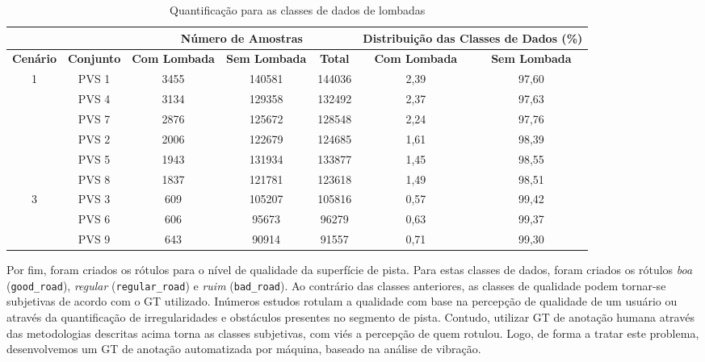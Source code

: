 \begin{table}[H]
\scriptsize
\centering
\caption{Quantificação para as classes de dados de lombadas} 
\label{table:lombada_metricas}
\begin{tabular}{ccccccc}
\cmidrule(l){3-7}
\multicolumn{1}{l}{} & 
\multicolumn{1}{l}{} & 
\multicolumn{3}{c}{\textbf{Número de Amostras}} & 
\multicolumn{2}{c}{\textbf{Distribuição das Classes de Dados (\%)}} \\ \midrule
\textbf{Cenário} & 
\textbf{Conjunto} & 
\textbf{Com Lombada} & 
\textbf{Sem Lombada} & 
\textbf{Total} & 
\textbf{Com Lombada} & 
\textbf{Sem Lombada} \\ \midrule

\multirow{4}{*}{1} & PVS 1 & 3455 & 140581 & 144036 & 2,39 & 97,60 \\ \cmidrule(l){2-7} 
 & PVS 4 & 3134 & 129358 & 132492 & 2,37 & 97,63 \\ \cmidrule(l){2-7} 
 & PVS 7 & 2876 & 125672 & 128548 & 2,24 & 97,76 \\ \midrule
 
\multirow{4}{*}{2} & PVS 2 & 2006 & 122679 & 124685 & 1,61 & 98,39 \\ \cmidrule(l){2-7} 
 & PVS 5 & 1943 & 131934 & 133877 & 1,45 & 98,55 \\ \cmidrule(l){2-7} 
 & PVS 8 & 1837 & 121781 & 123618 & 1,49 & 98,51 \\ \midrule
 
\multirow{4}{*}{3} & PVS 3 & 609 & 105207 & 105816 & 0,57 & 99,42 \\ \cmidrule(l){2-7} 
 & PVS 6 & 606 & 95673 & 96279 & 0,63 & 99,37 \\ \cmidrule(l){2-7} 
 & PVS 9 & 643 & 90914 & 91557 & 0,71 & 99,30 \\ \bottomrule
\end{tabular}
\end{table}

Por fim, foram criados os rótulos para o nível de qualidade da superfície de pista. Para estas classes de dados, foram criados os rótulos \emph{boa} (\texttt{good\_road}), \emph{regular} (\texttt{regular\_road}) e \emph{ruim} (\texttt{bad\_road}). Ao contrário das classes anteriores, as classes de qualidade podem tornar-se subjetivas de acordo com o GT utilizado. Inúmeros estudos rotulam a qualidade com base na percepção de qualidade de um usuário ou através da quantificação de irregularidades e obstáculos presentes no segmento de pista. Contudo, utilizar GT de anotação humana através das metodologias descritas acima torna as classes subjetivas, com viés a percepção de quem rotulou. Logo, de forma a tratar este problema, desenvolvemos um GT de anotação automatizada por máquina, baseado na análise de vibração.

